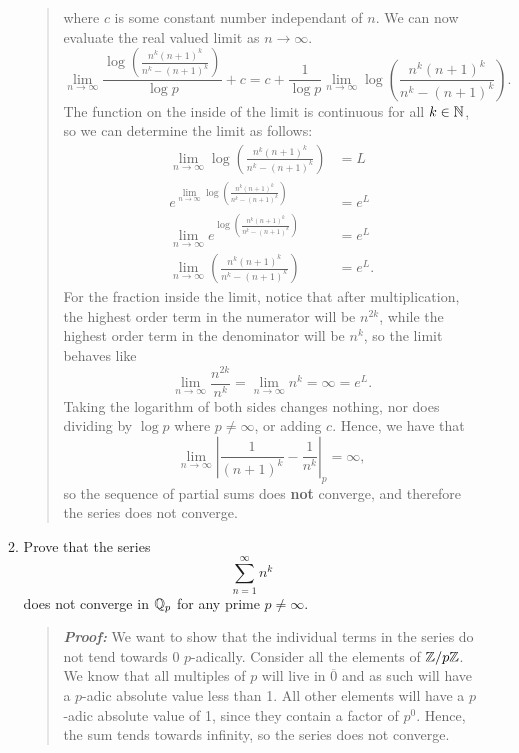 \documentclass{hw}
\begin{document}
\begin{enumerate}
\begin{enumerate}
\begin{quote}
\[	      	      	\]
	      	      	where $c$ is some constant number independant of $n$. We can now evaluate the real valued limit as $n\to\infty$.
	      	      	\[
	      	      		\lim_{n\to\infty}\frac{
	      	      			\log{\left(
	      	      				\frac{n^{k}(n+1)^{k}}{n^k-(n+1)^k}
	      	      				\right)}}{\log{p}} + c = c+\frac{1}{\log{p}}\lim_{n\to\infty}\log{\left(
	      	      		\frac{n^{k}(n+1)^{k}}{n^k-(n+1)^k}
	      	      		\right)}.
	      	      	\]
	      	      	The function on the inside of the limit is continuous for all $k\in\mathbb{N}$, so we can determine the limit as follows:
	      	      	\begin{align*}
	      	      		\lim_{n\to\infty}\log{\left(
	      	      		\frac{n^{k}(n+1)^{k}}{n^k-(n+1)^k}
	      	      		\right)} & = L      \\
	      	      		e^{
	      	      		\lim_{n\to\infty}\log{\left(
	      	      		\frac{n^{k}(n+1)^{k}}{n^k-(n+1)^k}
	      	      		\right)}
	      	      		}        & = e^{L}  \\
	      	      		\lim_{n\to\infty}e^{\log{\left(
	      	      		\frac{n^{k}(n+1)^{k}}{n^k-(n+1)^k}
	      	      		\right)}
	      	      		}        & = e^{L}  \\
	      	      		\lim_{n\to\infty}\left(
	      	      		\frac{n^{k}(n+1)^{k}}{n^k-(n+1)^k}
	      	      		\right)  & = e^{L}.
	      	      	\end{align*}
	      	      	For the fraction inside the limit, notice that after multiplication, the highest order term in the numerator will be $n^{2k}$, while the highest order term in the denominator will be $n^{k}$, so the limit behaves like
	      	      	\[
	      	      		\lim_{n\to\infty}\frac{n^{2k}}{n^k}=\lim_{n\to\infty}n^{k}=\infty = e^{L}.
	      	      	\]
	      	      	Taking the logarithm of both sides changes nothing, nor does dividing by $\log{p}$ where $p\neq\infty$, or adding $c$. Hence, we have that
	      	      	\[
	      	      		\lim_{n\to\infty}
	      	      		\left|
	      	      		\frac{1}{(n+1)^{k}}-\frac{1}{n^{k}}
	      	      		\right|_{p} = \infty,
	      	      	\]
	      	      	so the sequence of partial sums does \textbf{not} converge, and therefore the series does not converge.
	      	      \end{quote}

	      	\item Prove that the series
	      	      \[
	      	      	\sum_{n=1}^{\infty}n^{k}
	      	      \]
	      	      does not converge in $\mathbb{Q}_{p}$ for any prime $p\neq\infty$.
	      	      \begin{quote}
	      	      	\textit{\textbf{Proof:}} We want to show that the individual terms in the series do not tend towards 0 $p$-adically. Consider all the elements of $\mathbb{Z}/p\mathbb{Z}$. We know that all multiples of $p$ will live in $\overline{0}$ and as such will have a $p$-adic absolute value less than 1. All other elements will have a $p$-adic absolute value of 1, since they contain a factor of $p^{0}$. Hence, the sum tends towards infinity, so the series does not converge.
	      	      \end{quote}
	      \end{enumerate}
\end{enumerate}
\end{document}
